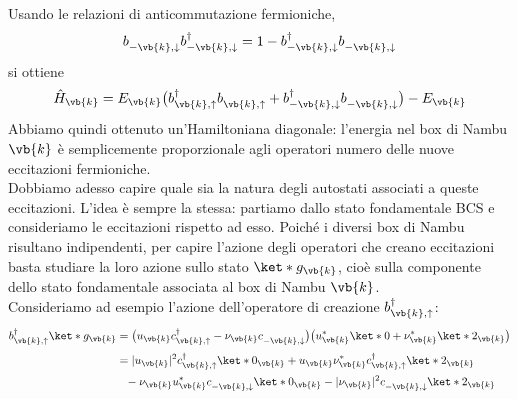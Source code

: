 Usando le relazioni di anticommutazione fermioniche,
\begin{equation*}
   b^{\vphantom{\dag}}_{-\vb{k},\downarrow} b^{\dag}_{-\vb{k},\downarrow}
   = 1- b^{\dag}_{-\vb{k},\downarrow} b^{\vphantom{\dag}}_{-\vb{k},\downarrow}
\end{equation*}
si ottiene
\begin{equation*}
   \hat{H}_{\vb{k}}
   =
   E_{\vb{k}} \bigl( b^{\dag}_{\vb{k},\uparrow} b^{\vphantom{\dag}}_{\vb{k},\uparrow} + b^{\dag}_{-\vb{k},\downarrow} b^{\vphantom{\dag}}_{-\vb{k},\downarrow} \bigr) - E_{\vb{k}}
\end{equation*}
Abbiamo quindi ottenuto un'Hamiltoniana diagonale: l'energia nel box di Nambu $\vb{k}$ è semplicemente proporzionale agli operatori numero delle nuove eccitazioni fermioniche.\\
Dobbiamo adesso capire quale sia la natura degli autostati associati a queste eccitazioni. L'idea è sempre la stessa: partiamo dallo stato fondamentale BCS e consideriamo le eccitazioni rispetto ad esso. Poiché i diversi box di Nambu risultano indipendenti, per capire l'azione degli operatori che creano eccitazioni basta studiare la loro azione sullo stato $\ket*{g_{\vb{k}}}$, cioè sulla componente dello stato fondamentale associata al box di Nambu $\vb{k}$.\\
Consideriamo ad esempio l'azione dell'operatore di creazione $b^{\dag}_{\vb{k},\uparrow}$:
\begin{equation*}
   \begin{split}
      b^{\dag}_{\vb{k},\uparrow}
      \ket*{g_{\vb{k}}}
      &=
      \bigl( u_{\vb{k}} c^{\dag}_{\vb{k},\uparrow} - \nu_{\vb{k}} c^{\vphantom{\dag}}_{-\vb{k},\downarrow} \bigr)
      \bigl( u^*_{\vb{k}} \ket*{0} + \nu^*_{\vb{k}} \ket*{2_{\vb{k}}} \bigr)
      \\[0.1cm]
      &=
      |u_{\vb{k}}|^2 c^{\dag}_{\vb{k},\uparrow} \ket*{0_{\vb{k}}}
      +
      u_{\vb{k}}\nu^*_{\vb{k}} c^{\dag}_{\vb{k},\uparrow} \ket*{2_{\vb{k}}}
      \\
      & \hphantom{=}
      -
      \nu_{\vb{k}}u^*_{\vb{k}} c^{\vphantom{\dag}}_{-\vb{k},\downarrow} \ket*{0_{\vb{k}}}
      -
      |\nu_{\vb{k}}|^2 c^{\vphantom{\dag}}_{-\vb{k},\downarrow} \ket*{2_{\vb{k}}}
   \end{split}
\end{equation*}
